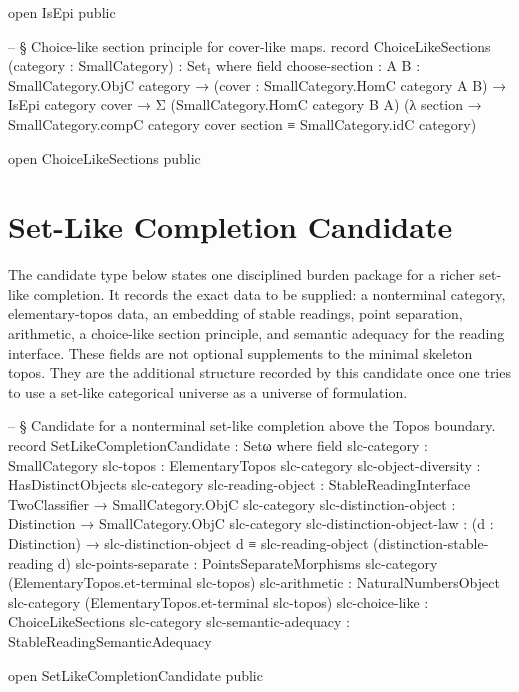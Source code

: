 \documentclass[11pt]{article}
\begin{document}
\begin{code}
open IsEpi public

-- § Choice-like section principle for cover-like maps.
record ChoiceLikeSections (category : SmallCategory) : Set₁ where
  field
    choose-section :
      {A B : SmallCategory.ObjC category} →
      (cover : SmallCategory.HomC category A B) →
      IsEpi category cover →
      Σ (SmallCategory.HomC category B A)
        (λ section →
          SmallCategory.compC category cover section ≡
          SmallCategory.idC category)

open ChoiceLikeSections public
\end{code}

\section{Set-Like Completion Candidate}

The candidate type below states one disciplined burden package for a
richer set-like completion.  It records the exact data to be supplied: a
nonterminal category, elementary-topos data, an embedding of stable
readings, point separation, arithmetic, a choice-like section principle,
and semantic adequacy for the reading interface.  These fields are not
optional supplements to the minimal skeleton topos.  They are the
additional structure recorded by this candidate once one tries to use a
set-like categorical universe as a universe of formulation.

\begin{code}
-- § Candidate for a nonterminal set-like completion above the Topos boundary.
record SetLikeCompletionCandidate : Setω where
  field
    slc-category          : SmallCategory
    slc-topos             : ElementaryTopos slc-category
    slc-object-diversity  : HasDistinctObjects slc-category
    slc-reading-object    : StableReadingInterface TwoClassifier →
                            SmallCategory.ObjC slc-category
    slc-distinction-object : Distinction → SmallCategory.ObjC slc-category
    slc-distinction-object-law :
      (d : Distinction) →
      slc-distinction-object d ≡
      slc-reading-object (distinction-stable-reading d)
    slc-points-separate   :
      PointsSeparateMorphisms slc-category (ElementaryTopos.et-terminal slc-topos)
    slc-arithmetic        :
      NaturalNumbersObject slc-category (ElementaryTopos.et-terminal slc-topos)
    slc-choice-like       : ChoiceLikeSections slc-category
    slc-semantic-adequacy : StableReadingSemanticAdequacy

open SetLikeCompletionCandidate public
\end{code}
\end{document}
